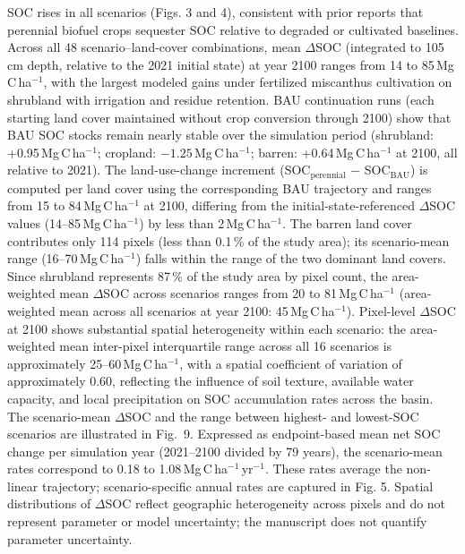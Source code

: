 \documentclass[11pt]{article}
\begin{document}
SOC rises in all scenarios (Figs. 3 and 4), consistent with prior reports \citep{AndersonTeixeira2009SOC,Gelfand2013MarginalLands,Jarecki2020Placeholder} that perennial biofuel crops sequester SOC relative to degraded or cultivated baselines. Across all 48 scenario--land-cover combinations, mean $\Delta$SOC (integrated to 105\,cm depth, relative to the 2021 initial state) at year 2100 ranges from 14 to 85\,Mg\,C\,ha$^{-1}$, with the largest modeled gains under fertilized miscanthus cultivation on shrubland with irrigation and residue retention. BAU continuation runs (each starting land cover maintained without crop conversion through 2100) show that BAU SOC stocks remain nearly stable over the simulation period (shrubland: +0.95\,Mg\,C\,ha$^{-1}$; cropland: $-1.25$\,Mg\,C\,ha$^{-1}$; barren: +0.64\,Mg\,C\,ha$^{-1}$ at 2100, all relative to 2021). The land-use-change increment (SOC$_\text{perennial}$ $-$ SOC$_\text{BAU}$) is computed per land cover using the corresponding BAU trajectory and ranges from 15 to 84\,Mg\,C\,ha$^{-1}$ at 2100, differing from the initial-state-referenced $\Delta$SOC values (14--85\,Mg\,C\,ha$^{-1}$) by less than 2\,Mg\,C\,ha$^{-1}$. The barren land cover contributes only 114 pixels (less than 0.1\,\% of the study area); its scenario-mean range (16--70\,Mg\,C\,ha$^{-1}$) falls within the range of the two dominant land covers. Since shrubland represents 87\,\% of the study area by pixel count, the area-weighted mean $\Delta$SOC across scenarios ranges from 20 to 81\,Mg\,C\,ha$^{-1}$ (area-weighted mean across all scenarios at year 2100: 45\,Mg\,C\,ha$^{-1}$). Pixel-level $\Delta$SOC at 2100 shows substantial spatial heterogeneity within each scenario: the area-weighted mean inter-pixel interquartile range across all 16 scenarios is approximately 25--60\,Mg\,C\,ha$^{-1}$, with a spatial coefficient of variation of approximately 0.60, reflecting the influence of soil texture, available water capacity, and local precipitation on SOC accumulation rates across the basin. The scenario-mean $\Delta$SOC and the range between highest- and lowest-SOC scenarios are illustrated in Fig.~9.
Expressed as endpoint-based mean net SOC change per simulation year (2021--2100 divided by 79 years), the scenario-mean rates correspond to 0.18 to 1.08\,Mg\,C\,ha$^{-1}$\,yr$^{-1}$. These rates average the non-linear trajectory; scenario-specific annual rates are captured in Fig. 5. Spatial distributions of $\Delta$SOC reflect geographic heterogeneity across pixels and do not represent parameter or model uncertainty; the manuscript does not quantify parameter uncertainty.
\end{document}
